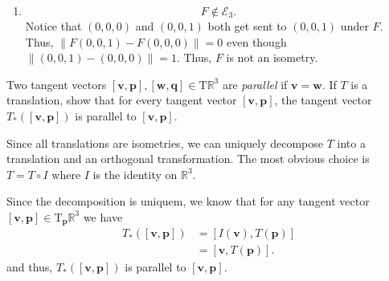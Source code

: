 \documentclass[12 pt, letterpaper]{hmcpset}
\begin{document}
\begin{solution}
\begin{enumerate}
			Suppose $\mathbf{v}$ is a nonzero vector orthogonal to $\mathbf{u}$ (such a vector always exists). Then we have
			\[
				\begin{split}
					F(\mathbf{p} + \mathbf{v}) & = ((\mathbf{p} + \mathbf{v}) \cdot \mathbf{u}) \mathbf{u} \\
								   & = (\mathbf{p} \cdot \mathbf{u} + \mathbf{v} \cdot \mathbf{u}) \mathbf{u} \\
								   & = (\mathbf{p} \cdot \mathbf{u}) \mathbf{u}	\\
								   & = F(\mathbf{p}).
				\end{split}
			\] 

			Thus, $\lVert F(\mathbf{p} + \mathbf{v}) - F(\mathbf{p}) \rVert = 0$ even though $\lVert \mathbf{p} + \mathbf{v} - \mathbf{p} \rVert = \lVert \mathbf{v} \rVert$ is nonzero. That is, $F$ is not an isometry.
		\item
			\[
				\boxed{
					F \notin \mathcal{E}_{3}.
				}
			\]
			Notice that $(0, 0, 0)$ and $(0, 0, 1)$ both get sent to $(0, 0, 1)$ under $F$. Thus, $\lVert F(0, 0, 1) - F(0, 0, 0) \rVert = 0$ even though $\lVert (0, 0, 1) - (0, 0, 0) \rVert = 1$. Thus, $F$ is not an isometry.
	\end{enumerate}
\end{solution}

\pagebreak

\begin{problem}[Problem 4.]
	Two tangent vectors $[\mathbf{v}, \mathbf{p}], [\mathbf{w}, \mathbf{q}] \in \mathrm{T}\mathbb{R}^{3}$ are \textit{parallel} if $\mathbf{v} = \mathbf{w}$. If $T$ is a translation, show that for every tangent vector $[\mathbf{v}, \mathbf{p}]$, the tangent vector $T_{*}([\mathbf{v}, \mathbf{p}])$ is parallel to $[\mathbf{v}, \mathbf{p}]$.
\end{problem}

\begin{solution}
	Since all translations are isometries, we can uniquely decompose $T$ into a translation and an orthogonal transformation. The most obvious choice is $T = T \circ I$ where $I$ is the identity on $\mathbb{R}^{3}$. 

	Since the decomposition is uniquem, we know that for any tangent vector $[\mathbf{v}, \mathbf{p}] \in \mathrm{T}_{\mathbf{p}} \mathbb{R}^{3}$ we have
	\[
		\begin{split}
			T_{*}([\mathbf{v}, \mathbf{p}]) & = [I(\mathbf{v}), T(\mathbf{p})] \\
							& = [\mathbf{v}, T(\mathbf{p})].
		\end{split} 
	\]
	and thus, $T_{*}([\mathbf{v}, \mathbf{p}])$ is parallel to $[\mathbf{v}, \mathbf{p}]$.
\end{solution}
\end{document}
